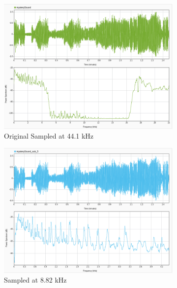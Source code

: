 \documentclass[12pt]{article}
\begin{document}
\begin{figure}[htbp]
  \centering
  \begin{subfigure}[b]{0.48\textwidth} %
    \includegraphics[width=\linewidth]{labs/lab1/lab-report-tex/figures/SigAnalyzer/PartD/mystery.png}
    \caption{Original Sampled at 44.1 kHz}
    \label{fig:f2}
  \end{subfigure}
  \begin{subfigure}[b]{0.48\textwidth} %
    \includegraphics[width=\linewidth]{labs/lab1/lab-report-tex/figures/SigAnalyzer/PartD/mystery_by5.png}
    \caption{Sampled at 8.82 kHz}
    \label{fig:f2}
  \end{subfigure}
  \begin{subfigure}[b]{0.48\textwidth} %

\end{subfigure}
\end{figure}
\end{document}
